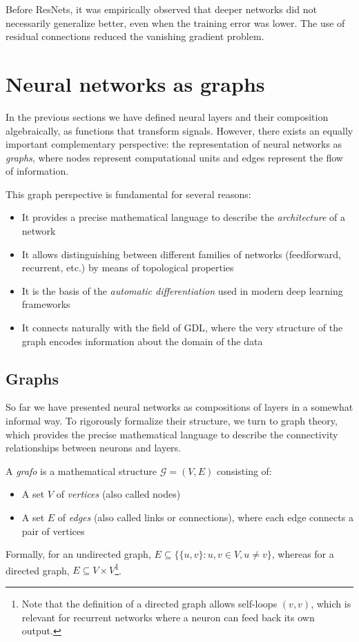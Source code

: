 Before ResNets, it was empirically observed that deeper networks did not necessarily generalize better, even when the training error was lower. The use of residual connections reduced the vanishing gradient problem.
\section{Neural networks as graphs}\label{sec:redes_grafos}

In the previous sections we have defined neural layers and their composition algebraically, as functions that transform signals. However, there exists an equally important complementary perspective: the representation of neural networks as \textit{graphs}, where nodes represent computational units and edges represent the flow of information.

This graph perspective is fundamental for several reasons:
\begin{itemize}
    \item It provides a precise mathematical language to describe the \textit{architecture} of a network
    \item It allows distinguishing between different families of networks (feedforward, recurrent, etc.) by means of topological properties
    \item It is the basis of the \textit{automatic differentiation} used in modern deep learning frameworks
    \item It connects naturally with the field of \gls{GDL}, where the very structure of the graph encodes information about the domain of the data
\end{itemize}

\subsection{Graphs}

So far we have presented neural networks as compositions of layers in a somewhat informal way. To rigorously formalize their structure, we turn to graph theory, which provides the precise mathematical language to describe the connectivity relationships between neurons and layers.

\begin{definition}\label{def:grafo_neuronal}
A \textit{\gls{grafo}} is a mathematical structure $\mathcal{G} = (V, E)$ consisting of:
\begin{itemize}
    \item A set $V$ of \textit{vertices} (also called nodes)
    \item A set $E$ of \textit{edges} (also called links or connections), where each edge connects a pair of vertices
\end{itemize}
Formally, for an undirected graph, $E \subseteq \{\{u, v\} : u, v \in V, u \neq v\}$, whereas for a directed graph, $E \subseteq V \times V$\footnote{Note that the definition of a directed graph allows self-loops $(v, v)$, which is relevant for recurrent networks where a neuron can feed back its own output.}.
\end{definition}

